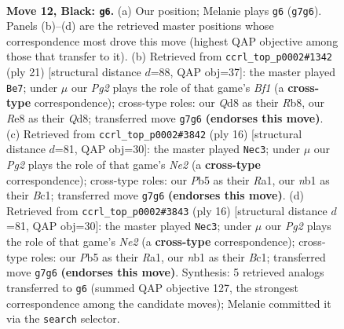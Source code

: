 \documentclass[11pt]{article}
\begin{document}
\clearpage

\begin{figure}[p]\centering
\begin{subfigure}{0.46\textwidth}\centering
\resizebox{\linewidth}{!}{%
\newchessgame
\chessboard[
  setfen={rnbqr1k1/p3bppp/2p1p3/1p1n4/3P4/3Q1BP1/PP1NPPKP/RNB2R2 b - - 1 12},
  showmover=false,
  pgfstyle=straightmove, color=movearrow, markmove={g7-g6}
]}
\caption{}
\end{subfigure}\hfill
\begin{subfigure}{0.46\textwidth}\centering
\resizebox{\linewidth}{!}{%
\newchessgame
\chessboard[
  setfen={1r1qkb1r/1bpn1ppp/p3p3/1p1nP3/3P4/2NQ1N2/PP2BPPP/R1B2RK1 b k - 2 11},
  showmover=false,
  pgfstyle=straightmove, color=movearrow, markmove={f8-e7}
]}
\caption{}
\end{subfigure}
\\[4pt]
\begin{subfigure}{0.46\textwidth}\centering
\resizebox{\linewidth}{!}{%
\newchessgame
\chessboard[
  setfen={r1bqkb1r/3n1ppp/p2p1n2/1p1Np3/4P3/6P1/PPP1NP1P/R1BQKB1R w KQkq - 2 9},
  showmover=false,
  pgfstyle=straightmove, color=movearrow, markmove={e2-c3}
]}
\caption{}
\end{subfigure}\hfill
\begin{subfigure}{0.46\textwidth}\centering
\resizebox{\linewidth}{!}{%
\newchessgame
\chessboard[
  setfen={r1bqkb1r/3n1ppp/p2p1n2/1p1Np3/4P3/6P1/PPP1NP1P/R1BQKB1R w KQkq - 2 9},
  showmover=false,
  pgfstyle=straightmove, color=movearrow, markmove={e2-c3}
]}
\caption{}
\end{subfigure}
\caption{\textbf{Move 12, Black: \texttt{g6}.} (a) Our position; Melanie plays \texttt{g6} (\texttt{g7g6}). Panels (b)--(d) are the retrieved master positions whose correspondence most drove this move (highest QAP objective among those that transfer to it). (b) Retrieved from \texttt{ccrl\_top\_p0002\#1342} (ply 21) [structural distance $d$=88, QAP obj=37]: the master played \texttt{Be7}; under $\mu$ our \emph{Pg2} plays the role of that game's \emph{Bf1} (a \textbf{cross-type} correspondence); cross-type roles: our \emph{Q}d8 as their \emph{R}b8, our \emph{R}e8 as their \emph{Q}d8; transferred move \texttt{g7g6} \textbf{(endorses this move)}. (c) Retrieved from \texttt{ccrl\_top\_p0002\#3842} (ply 16) [structural distance $d$=81, QAP obj=30]: the master played \texttt{Nec3}; under $\mu$ our \emph{Pg2} plays the role of that game's \emph{Ne2} (a \textbf{cross-type} correspondence); cross-type roles: our \emph{P}b5 as their \emph{R}a1, our \emph{n}b1 as their \emph{B}c1; transferred move \texttt{g7g6} \textbf{(endorses this move)}. (d) Retrieved from \texttt{ccrl\_top\_p0002\#3843} (ply 16) [structural distance $d$=81, QAP obj=30]: the master played \texttt{Nec3}; under $\mu$ our \emph{Pg2} plays the role of that game's \emph{Ne2} (a \textbf{cross-type} correspondence); cross-type roles: our \emph{P}b5 as their \emph{R}a1, our \emph{n}b1 as their \emph{B}c1; transferred move \texttt{g7g6} \textbf{(endorses this move)}. Synthesis: 5 retrieved analogs transferred to \texttt{g6} (summed QAP objective 127, the strongest correspondence among the candidate moves); Melanie committed it via the \texttt{search} selector.}

\end{figure}
\end{document}
